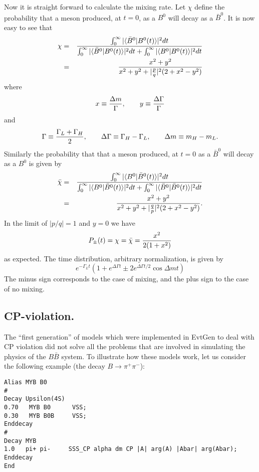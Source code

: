 Now it is straight forward to calculate the mixing rate. Let $\chi$ 
define the probability that a meson produced, at $t=0$, as a $B^0$ will
decay as a $\bar B^0$. It is now easy to see that 
\begin{eqnarray}
\chi & = &{\int_0^\infty |\langle \bar B^0|B^0(t)\rangle|^2dt \over
\int_0^\infty |\langle \bar B^0|B^0(t)\rangle|^2dt +
\int_0^\infty |\langle B^0| B^0(t)\rangle|^2dt }\nonumber\\
  & = & { x^2+y^2 \over x^2+y^2+\vert {p\over q} \vert^2(2+x^2-y^2)} 
\end{eqnarray}
where 
\begin{equation}
x\equiv {\Delta m \over \Gamma},\qquad y\equiv {\Delta\Gamma\over \Gamma}
\end{equation}
and
\begin{equation}
\Gamma\equiv {\Gamma_L+\Gamma_H \over 2},\qquad
\Delta\Gamma \equiv \Gamma_H-\Gamma_L,\qquad
\Delta m \equiv m_H-m_L.
\end{equation}
Similarly the probability that that a meson produced, at $t=0$ 
as a $\bar B^0$ will decay as a $B^0$ is given by
\begin{eqnarray}
\bar \chi & = &{\int_0^\infty |\langle B^0|\bar B^0(t)\rangle|^2dt \over
\int_0^\infty |\langle B^0|\bar B^0(t)\rangle|^2dt +
\int_0^\infty |\langle \bar B^0| \bar B^0(t)\rangle|^2dt }\nonumber\\
  & = & { x^2+y^2 \over x^2+y^2+\vert {q\over p} \vert^2(2+x^2-y^2)}.
\end{eqnarray}
In the limit of $|p/q|=1$ and $y=0$ we have 
\begin{equation}
P_{\pm}(t)=\chi =\bar\chi={x^2\over 2(1+x^2)}
\end{equation}
as expected.
The time distribution, arbitrary normalization, is given by
\begin{equation}
e^{-\Gamma_L t}(1+e^{\Delta\Gamma t}\pm 2e^{\Delta\Gamma t/2}\cos\Delta m t)
\end{equation}
The minus sign corresponds to the case of mixing, and the plus sign
to the case of no mixing.


\subsection{CP-violation.}

The ``first generation'' of models which were implemented in EvtGen
to deal with CP violation did not solve all the problems that are 
involved in simulating the physics of the $B\bar B$ system. To illustrate how 
these models work, let us consider the following example (the decay 
$B\rightarrow \pi^+\pi^-$):
\begin{verbatim}
Alias MYB B0
#
Decay Upsilon(4S)
0.70   MYB B0      VSS;
0.30   MYB B0B     VSS;
Enddecay
#
Decay MYB
1.0   pi+ pi-     SSS_CP alpha dm CP |A| arg(A) |Abar| arg(Abar);
Enddecay
End
\end{verbatim}

